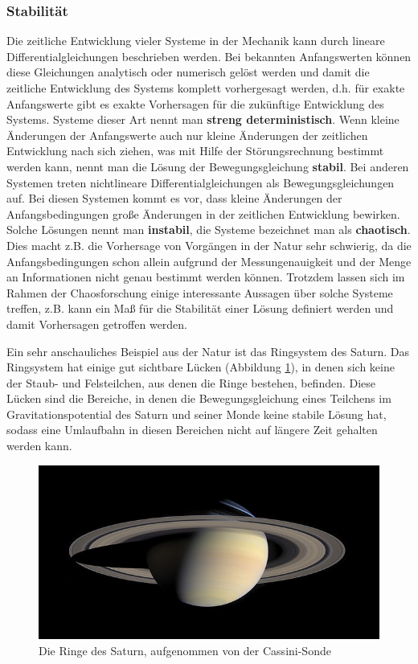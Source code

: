 \subsubsection{Stabilität}
Die zeitliche Entwicklung vieler Systeme in der Mechanik kann durch lineare Differentialgleichungen beschrieben werden. Bei bekannten Anfangswerten können diese Gleichungen analytisch oder numerisch gelöst werden und damit die zeitliche Entwicklung des Systems komplett vorhergesagt werden, d.h. für exakte Anfangswerte gibt es exakte Vorhersagen für die zukünftige Entwicklung des Systems. Systeme dieser Art nennt man \textbf{streng deterministisch}. Wenn kleine Änderungen der Anfangswerte auch nur kleine Änderungen der zeitlichen Entwicklung nach sich ziehen, was mit Hilfe der Störungsrechnung bestimmt werden kann, nennt man die Lösung der Bewegungsgleichung \textbf{stabil}.
Bei anderen Systemen treten nichtlineare Differentialgleichungen als Bewegungsgleichungen auf. Bei diesen Systemen kommt es vor, dass kleine Änderungen der Anfangsbedingungen große Änderungen in der zeitlichen Entwicklung bewirken. Solche Lösungen nennt man  \textbf{instabil}, die Systeme bezeichnet man als \textbf{chaotisch}. Dies macht z.B. die Vorhersage von Vorgängen in der Natur sehr schwierig, da die Anfangsbedingungen schon allein aufgrund der Messungenauigkeit und der Menge an Informationen nicht genau bestimmt werden können. Trotzdem lassen sich im Rahmen der Chaosforschung einige interessante Aussagen über solche Systeme treffen, z.B. kann ein Maß für die Stabilität einer Lösung definiert werden und damit Vorhersagen getroffen werden.

Ein sehr anschauliches Beispiel aus der Natur ist das Ringsystem des Saturn. Das Ringsystem hat einige gut sichtbare Lücken (Abbildung \ref{foto-saturn}), in denen sich keine der Staub- und Felsteilchen, aus denen die Ringe bestehen, befinden. Diese Lücken sind die Bereiche, in denen die Bewegungsgleichung eines Teilchens im Gravitationspotential des Saturn und seiner Monde keine stabile Lösung hat, sodass eine Umlaufbahn in diesen Bereichen nicht auf längere Zeit gehalten werden kann.
\begin{figure}
\includegraphics[width=1.0\textwidth]{images/saturn.jpg}
\caption{Die Ringe des Saturn, aufgenommen von der Cassini-Sonde}
\label{foto-saturn}
\end{figure}

